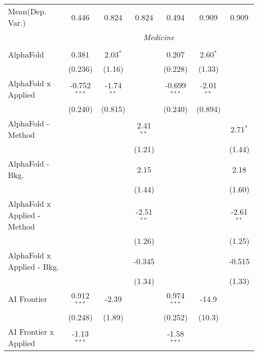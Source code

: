 \begin{tabular}{lcccccc}
Mean(Dep. Var.) & 0.446 & 0.824 & 0.824 & 0.494 & 0.909 & 0.909 \\
 & \multicolumn{6}{c}{\textit{Medicine}} \\ \\
   AlphaFold                    & 0.381          & 2.03$^{*}$   &              & 0.207          & 2.60$^{*}$   &   \\   
                                & (0.236)        & (1.16)       &              & (0.228)        & (1.33)       &   \\   
   AlphaFold x Applied          & -0.752$^{***}$ & -1.74$^{**}$ &              & -0.699$^{***}$ & -2.01$^{**}$ &   \\   
                                & (0.240)        & (0.815)      &              & (0.240)        & (0.894)      &   \\   
   AlphaFold - Method           &                &              & 2.41$^{**}$  &                &              & 2.71$^{*}$\\   
                                &                &              & (1.21)       &                &              & (1.44)\\   
   AlphaFold - Bkg.             &                &              & 2.15         &                &              & 2.18\\   
                                &                &              & (1.44)       &                &              & (1.60)\\   
   AlphaFold x Applied - Method &                &              & -2.51$^{**}$ &                &              & -2.61$^{**}$\\   
                                &                &              & (1.26)       &                &              & (1.25)\\   
   AlphaFold x Applied - Bkg.   &                &              & -0.345       &                &              & -0.515\\   
                                &                &              & (1.34)       &                &              & (1.33)\\   
   AI Frontier                  & 0.912$^{***}$  & -2.39        &              & 0.974$^{***}$  & -14.9        &   \\   
                                & (0.248)        & (1.89)       &              & (0.252)        & (10.3)       &   \\   
   AI Frontier x Applied        & -1.13$^{***}$  &              &              & -1.58$^{***}$  &              &   \\   

\end{tabular}
